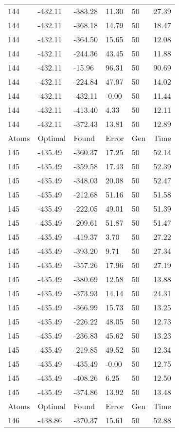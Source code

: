\documentclass{report}
\begin{document}
\begin{appendix}
\begin{longtable}{llllll}
144 & -432.11 & -383.28 & 11.30 & 50 & 27.39 \\
144 & -432.11 & -368.18 & 14.79 & 50 & 18.47 \\
144 & -432.11 & -364.50 & 15.65 & 50 & 12.08 \\
144 & -432.11 & -244.36 & 43.45 & 50 & 11.88 \\
144 & -432.11 & -15.96 & 96.31 & 50 & 90.69 \\
144 & -432.11 & -224.84 & 47.97 & 50 & 14.02 \\
144 & -432.11 & -432.11 & -0.00 & 50 & 11.44 \\
144 & -432.11 & -413.40 & 4.33 & 50 & 12.11 \\
144 & -432.11 & -372.43 & 13.81 & 50 & 12.89 \\
Atoms & Optimal & Found & Error & Gen & Time \\
145 & -435.49 & -360.37 & 17.25 & 50 & 52.14 \\
145 & -435.49 & -359.58 & 17.43 & 50 & 52.39 \\
145 & -435.49 & -348.03 & 20.08 & 50 & 52.47 \\
145 & -435.49 & -212.68 & 51.16 & 50 & 51.58 \\
145 & -435.49 & -222.05 & 49.01 & 50 & 51.39 \\
145 & -435.49 & -209.61 & 51.87 & 50 & 51.47 \\
145 & -435.49 & -419.37 & 3.70 & 50 & 27.22 \\
145 & -435.49 & -393.20 & 9.71 & 50 & 27.34 \\
145 & -435.49 & -357.26 & 17.96 & 50 & 27.19 \\
145 & -435.49 & -380.69 & 12.58 & 50 & 13.88 \\
145 & -435.49 & -373.93 & 14.14 & 50 & 24.31 \\
145 & -435.49 & -366.99 & 15.73 & 50 & 13.25 \\
145 & -435.49 & -226.22 & 48.05 & 50 & 12.73 \\
145 & -435.49 & -236.83 & 45.62 & 50 & 13.23 \\
145 & -435.49 & -219.85 & 49.52 & 50 & 12.34 \\
145 & -435.49 & -435.49 & -0.00 & 50 & 12.75 \\
145 & -435.49 & -408.26 & 6.25 & 50 & 12.50 \\
145 & -435.49 & -374.86 & 13.92 & 50 & 13.48 \\
Atoms & Optimal & Found & Error & Gen & Time \\
146 & -438.86 & -370.37 & 15.61 & 50 & 52.88 \\

\end{longtable}
\end{appendix}
\end{document}
